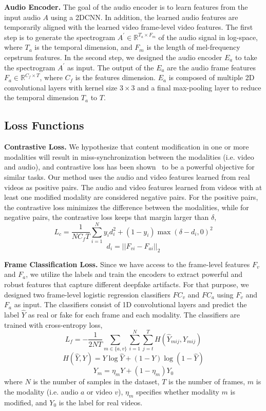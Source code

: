 \documentclass[conference, a4paper]{IEEEtran}
\makeatletter
\newcommand*{\ie}{i.e.\@\xspace}
\makeatother
\begin{document}
\noindent \textbf{Audio Encoder.} The goal of the audio encoder is to learn features from the input audio $A$ using a 2DCNN. In addition, the learned audio features are temporarily aligned with the learned video frame-level video features. The first step is to generate the spectrogram $A^\prime \in \mathbb{R}^{T_a\times F_m}$ of the audio signal in log-space, where $T_a$ is the temporal dimension, and $F_m$ is the length of mel-frequency cepstrum features. In the second step, we designed the audio encoder $E_a$ to take the spectrogram $A^\prime$ as input. The output of the $E_a$ are the audio frame features $F_a \in \mathbb{R}^{C_f \times T}$, where $C_f$ is the features dimension. $E_a$ is composed of multiple 2D convolutional layers with kernel size $3\times 3$ and a final max-pooling layer to reduce the temporal dimension $T_a$ to $T$.

\subsection{Loss Functions}  
\noindent \textbf{Contrastive Loss.} We hypothesize that content modification in one or more modalities will result in miss-synchronization between the modalities (\ie video and audio), and contrastive loss has been shown~\cite{chung_out_2017, chugh_not_2020} to be a powerful objective for similar tasks. Our method uses the audio and video features learned from real videos as positive pairs. The audio and video features learned from videos with at least one modified modality are considered negative pairs. For the positive pairs, the contrastive loss minimizes the difference between the modalities, while for negative pairs, the contrastive loss keeps that margin larger than $\delta$,
$$L_c = \frac{1}{NC_fT}\sum^N_{i=1}y_{i}d_{i}^{2} + (1-y_i)\max(\delta - d_{i}, 0)^2 $$
$$d_i = ||F_{vi} - F_{ai}||_2$$

\noindent \textbf{Frame Classification Loss.} Since we have access to the frame-level features $F_v$ and $F_a$, we utilize the labels and train the encoders to extract powerful and robust features that capture different deepfake artifacts. For that purpose, we designed two frame-level logistic regression classifiers $FC_v$ and $FC_a$ using $F_v$ and $F_a$ as input. The classifiers consist of 1D convolutional layers and predict the label $\hat{Y}$ as real or fake for each frame and each modality. The classifiers are trained with cross-entropy loss,
$$ L_{f} = -\frac{1}{2NT}\sum_{m\in\{a, v\}}\sum^N_{i=1}\sum^T_{j=t}H(\hat{Y}_{mij},Y_{mij}) $$
$$ H(\hat{Y}, Y) = Y\log{\hat{Y}} + (1 - Y)\log{(1-\hat{Y})} $$
$$Y_m = \eta_m Y + (1 - \eta_m)Y_0$$
where $N$ is the number of samples in the dataset, $T$ is the number of frames, $m$ is the modality (\ie audio $a$ or video $v$), $\eta_m$ specifies whether modality $m$ is modified, and $Y_0$ is the label for real videos.
\end{document}
